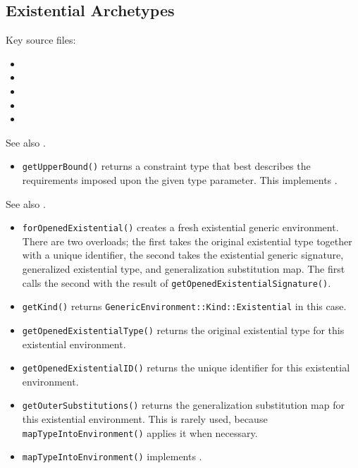 \documentclass[../generics]{subfiles}
\begin{document}
\subsection*{Existential Archetypes}

Key source files:
\begin{itemize}
\item {}
\item {}
\item {}
\item {}
\item {}
\end{itemize}

See also .
\begin{itemize}
\item \texttt{getUpperBound()} returns a constraint type that best describes the requirements imposed upon the given type parameter. This implements .
\end{itemize}

See also .
\begin{itemize}
\item \texttt{forOpenedExistential()} creates a fresh existential generic environment. There are two overloads; the first takes the original existential type together with a unique identifier, the second takes the existential generic signature, generalized existential type, and generalization substitution map. The first calls the second with the result of \texttt{getOpenedExistentialSignature()}.
\item \texttt{getKind()} returns \texttt{GenericEnvironment::Kind::Existential} in this case.
\item \texttt{getOpenedExistentialType()} returns the original existential type for this existential environment.
\item \texttt{getOpenedExistentialID()} returns the unique identifier for this existential environment.
\item \texttt{getOuterSubstitutions()} returns the generalization substitution map for this existential environment. This is rarely used, because \texttt{mapTypeIntoEnvironment()} applies it when necessary.
\item \texttt{mapTypeIntoEnvironment()} implements .
\end{itemize}
\end{document}
